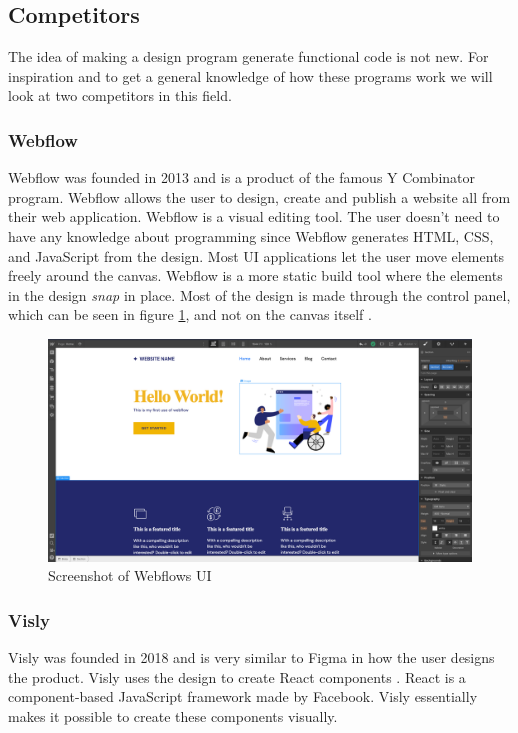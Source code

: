 \subsection{Competitors}%
\label{sub:Competitors}
The idea of making a design program generate functional code is not new. For inspiration and to get a general knowledge of how these programs work we will look at two competitors in this field. 

\subsubsection{Webflow}
Webflow was founded in 2013 and is a product of the famous Y Combinator program. Webflow allows the user to design, create and publish a website all from their web application. Webflow is a visual editing tool. The user doesn't need to have any knowledge about programming since Webflow generates HTML, CSS, and JavaScript from the design. Most UI applications let the user move elements freely around the canvas. Webflow is a more static build tool where the elements in the design \textit{snap} in place. Most of the design is made through the control panel, which can be seen in figure \ref{fig:webflow}, and not on the canvas itself \cite{ResponsiveWebDesign}.

\begin{figure}[H]
  \centering
  \includegraphics[width=0.8\linewidth]{images/webflow.png}
  \caption{Screenshot of Webflows UI }%
  \label{fig:webflow}
\end{figure}

\subsubsection{Visly}%
\label{ssub:Visly}
Visly was founded in 2018 and is very similar to Figma in how the user designs the product. Visly uses the design to create React components \cite{facebookincReactJavaScriptLibrary}. React is a component-based JavaScript framework made by Facebook. Visly essentially makes it possible to create these components visually. 


